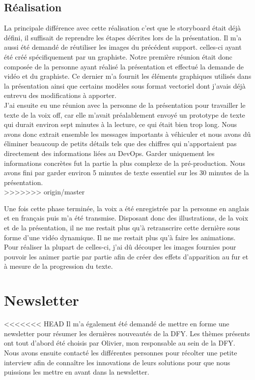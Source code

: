\subsection{Réalisation}
La principale différence avec cette réalisation c'est que le storyboard était déjà défini, il suffisait de reprendre les étapes décrites lors de la présentation. Il m'a aussi été demandé de réutiliser les images du précédent support. celles-ci ayant été créé spécifiquement par un graphiste. Notre première réunion était donc composée de la personne ayant réalisé la présentation et effectué la demande de vidéo et du graphiste. Ce dernier m'a fournit les éléments graphiques utilisés dans la présentation ainsi que certains modèles sous format vectoriel dont j'avais déjà entrevu des modifications à apporter.\\

J'ai ensuite eu une réunion avec la personne de la présentation pour travailler le texte de la voix off, car elle m'avait préalablement envoyé un prototype de texte qui durait environ sept minutes à la lecture, ce qui était bien trop long. Nous avons donc extrait ensemble les messages importants à véhiculer et nous avons dû éliminer beaucoup de petits détails tels que des chiffres qui n'apportaient pas directement des informations liées au DevOps. Garder uniquement les informations concrètes fut la partie la plus complexe de la pré-production. Nous avons fini par garder environ 5 minutes de texte essentiel sur les 30 minutes de la présentation.\\
>>>>>>> origin/master

Une fois cette phase terminée, la voix a été enregistrée par la personne en anglais et en français puis m'a été transmise. Disposant donc des illustrations, de la voix et de la présentation, il ne me restait plus qu'à retranscrire cette dernière sous forme d'une vidéo dynamique. Il ne me restait plus qu'à faire les animations. Pour réaliser la plupart de  celles-ci, j'ai dû découper les images fournies pour pouvoir les animer partie par partie afin de créer des effets d'apparition au fur et à mesure de la progression du texte. 


\section{Newsletter}

<<<<<<< HEAD
Il m'a également été demandé de mettre en forme une newsletter pour résumer les dernières nouveautés de la DFY. Les thèmes présents ont tout d'abord été choisis par Olivier, mon responsable au sein de la DFY. Nous avons ensuite contacté les différentes personnes pour récolter une petite interview afin de connaître les innovations de leurs solutions pour que nous puissions les mettre en avant dans la newsletter.\\


